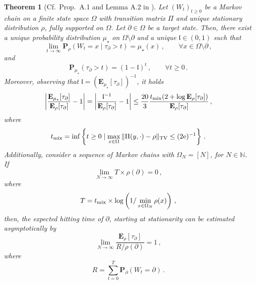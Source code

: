 \documentclass[11pt,oneside]{amsart}
\numberwithin{equation}{section}  %
\theoremstyle{plain}
\newtheorem{theorem}{Theorem}
\newcommand{\N}{\mathbb{N}}
\newcommand{\quench}{\mathbf{P}}
\begin{document}
\begin{theorem}[Cf.~Prop.~A.1 and Lemma A.2 in \cite{SQ}]\label{thm:aldous}
	Let $(W_t)_{t\ge 0}$ be a Markov chain on a finite state space $\Omega$ with transition matrix $\Pi$ and unique stationary distribution $\rho$, fully supported on $\Omega$. Let $\partial\in\Omega$ be a \emph{target state}. Then, there exist a unique probability distribution $\mu_\star$ on 
    $\Omega\setminus \partial$ and a unique $\mathfrak{l} \in (0,1)$ such that
	\begin{equation}
		\lim_{t\to\infty}\quench_\rho \left(W_t=x\mid \tau_{\partial}>t \right)=\mu_\star(x)\,,\qquad \forall x\in\Omega\setminus\partial\,,
	\end{equation}
	and
		\begin{equation}
		\quench_{\mu_\star} \left( \tau_{\partial}>t \right)=(1-\mathfrak{l})^t\,,\qquad \forall t\ge 0\,.
	\end{equation}
	Moreover, observing that $\mathfrak{l}=(\mathbf{E}_{\mu_\star}[\tau_{\partial}])^{-1}$, it holds
	\begin{equation}
		\left|\frac{\mathbf{E}_{\mu_\star}[\tau_{\partial}]}{\mathbf{E}_{\rho}[\tau_{\partial}]}-1 \right|=	\left|\frac{\mathfrak{l}^{-1}}{\mathbf{E}_{\rho}[\tau_{\partial}]}-1 \right|\le \frac{20}{3}\frac{t_{\rm mix}(2+\log\mathbf{E}_{\rho}[\tau_{\partial}])}{\mathbf{E}_{\rho}[\tau_{\partial}]}\,,
	\end{equation}
where
 \begin{equation}
t_{\rm mix}=	\inf\left\{t\ge 0\mid \max_{x\in\Omega}\|\Pi(y,\cdot)-\rho \|_{\rm TV}\le  (2{\rm e})^{-1} \right\}\,.
 \end{equation}
Additionally, consider a sequence of Markov chains with $\Omega_N=[N]$, for $N \in \N$.
If 
\begin{equation}
	\lim_{N\to\infty} T\times \rho(\partial)=0\,,
\end{equation}
where
\begin{equation}\label{eq:T-new}
	T= t_{\rm mix}\times \log\left(1/\min_{x \in\Omega_N}\rho(x)\right)\,,
\end{equation}
then, the expected hitting time of $\partial$, starting at stationarity can be estimated asymptotically by
\begin{equation}\label{eq:est-mean}
	\lim_{N\to\infty}\frac{\mathbf{E}_\rho[\tau_{\partial}]}{R/\rho(\partial)}=1\,,
\end{equation}
where
\begin{equation}\label{eq:R-new}
	R=\sum_{t=0}^{T} {\mathbf{P}}_{\partial}(W_{t} = \partial)\,.
\end{equation}
\end{theorem}  
\end{document}
